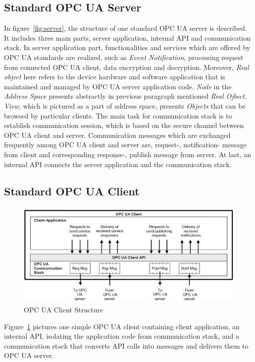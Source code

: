 \subsection{Standard OPC UA Server}
In figure~\ref{fig:server}, the structure of one standard OPC UA server is described. It includes three main parts, server application, internal API and communication stack. In server application part,  functionalities and services which are offered by OPC UA standards are realized, such as \emph{Event Notification}, processing request from connected OPC UA client, data encryption and decryption. Moreover, \emph{Real object}  here refers to the device hardware and software application that is maintained and managed by OPC UA server application code. \emph{Node} in the \emph{Address Space} presents abstractly in previous paragraph mentioned \emph{Real Ojbect}. \emph{View}, which is pictured as a part of address space, presents \emph{Objects} that can be browsed by particular clients. The main task for communication stack  is to establish communication session, which is based on the secure channel between OPC UA client and server. 
Communication messages which are exchanged frequently among OPC UA client and server are, request-, notification- message from client and corresponding  response-, publish message from server. At last, an internal API connects the server application and the communication stack.

\subsection{Standard OPC UA Client}
\begin{figure}[!htbp]
	\centering
	\includegraphics[width=1.0\textwidth]{client.jpg}
		\caption{OPC UA Client Structure \cite{O1}}
	\label{fig:client}
\end{figure}

Figure~\ref{fig:client} pictures one simple OPC UA client containing client application, an internal API, isolating the application code from communication stack, and a communication stack that converts API calls into messages and delivers them to OPC UA server.

